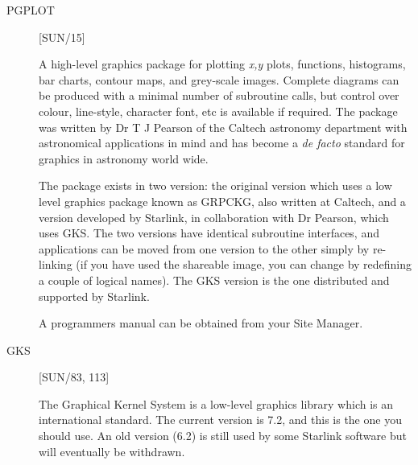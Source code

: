 \begin{description}

\item [PGPLOT] \hfill [SUN/15]

A high-level graphics package for plotting {\em x,y} plots, functions,
histograms, bar charts, contour maps, and grey-scale images.
Complete diagrams can be produced with a minimal number of subroutine calls,
but control over colour, line-style, character font, etc is available if
required.
The package was written by Dr T J Pearson of the Caltech astronomy department
with astronomical applications in mind and has become a {\it de facto} standard
for graphics in astronomy world wide.

The package exists in two version: the original version which uses a low
level graphics package known as GRPCKG, also written at Caltech, and a version
developed by Starlink, in collaboration with Dr Pearson, which uses GKS.
The two versions have identical subroutine interfaces, and applications can be
moved from one version to the other simply by re-linking (if you have used the
shareable image, you can change by redefining a couple of logical names).
The GKS version is the one distributed and supported by Starlink.

A programmers manual can be obtained from your Site Manager.

\item [GKS] \hfill [SUN/83, 113]

The Graphical Kernel System is a low-level graphics library which is an
international standard.
The current version is 7.2, and this is the one you should use.
An old version (6.2) is still used by some Starlink software but will eventually
be withdrawn.


\end{description}

